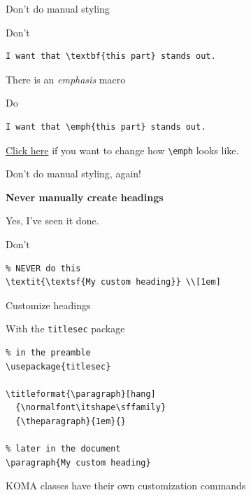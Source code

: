 \documentclass[xetex, onlymath, handout]{beamer}
\begin{document}
\begin{frame}[fragile]{Don't do manual styling}

  \begin{alertblock}{Don't}
    \begin{lstlisting}
I want that \textbf{this part} stands out.
    \end{lstlisting}
  \end{alertblock}

  There is an \emph{emphasis} macro

  \begin{block}{Do}
    \begin{lstlisting}
I want that \emph{this part} stands out.
    \end{lstlisting}
  \end{block}

  \href{https://github.com/HSR-Stud/Willkommen/blob/master/Guidelines.md#text-and-structure}{Click here} if you want to change how \lstinline!\emph! looks like.

\end{frame}

\begin{frame}[fragile]{Don't do manual styling, again!}

  {\LARGE \bfseries Never manually create headings}
  
  Yes, I've seen it done.

  \begin{alertblock}{Don't}
    \begin{lstlisting}
% NEVER do this
\textit{\textsf{My custom heading}} \\[1em]
    \end{lstlisting}
  \end{alertblock}

\end{frame}

\begin{frame}[fragile]{Customize headings}

  \begin{exampleblock}{With the \texttt{titlesec} package}
    \begin{lstlisting}
% in the preamble
\usepackage{titlesec}

\titleformat{\paragraph}[hang]
  {\normalfont\itshape\sffamily}
  {\theparagraph}{1em}{}

% later in the document
\paragraph{My custom heading}
    \end{lstlisting}
  \end{exampleblock}

  \begin{block}{}
    KOMA classes have their own customization commands
  \end{block}
\end{frame}
\end{document}
